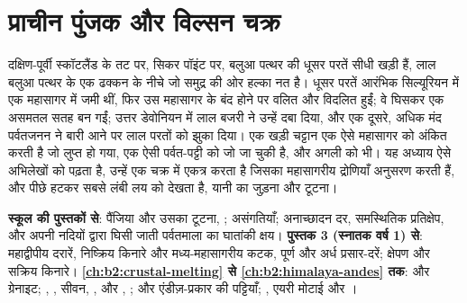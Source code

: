 \chapter{प्राचीन पुंजक और विल्सन चक्र}\label{ch:b2:wilson-cycle}

दक्षिण-पूर्वी स्कॉटलैंड के तट पर, सिकर पॉइंट पर, बलुआ पत्थर की धूसर परतें सीधी खड़ी हैं,
लाल बलुआ पत्थर के एक ढक्कन के नीचे जो समुद्र की ओर हल्का नत है। धूसर परतें आरंभिक सिल्यूरियन में
एक महासागर में जमी थीं, फिर उस महासागर के बंद होने पर वलित और विदलित हुईं; वे घिसकर
एक असमतल सतह बन गईं; उत्तर डेवोनियन में लाल बजरी ने उन्हें दबा दिया, और एक दूसरे,
अधिक मंद पर्वतजनन ने बारी आने पर लाल परतों को झुका दिया। एक खड़ी चट्टान एक ऐसे महासागर को अंकित करती है जो
लुप्त हो गया, एक ऐसी पर्वत-पट्टी को जो जा चुकी है, और अगली को भी। यह अध्याय ऐसे अभिलेखों को पढ़ता है,
उन्हें एक चक्र में एकत्र करता है जिसका महासागरीय द्रोणियाँ अनुसरण करती हैं, और पीछे हटकर सबसे लंबी लय को देखता है,
यानी  का जुड़ना और टूटना।

\begin{recall}
\textbf{स्कूल की पुस्तकों से}: पैंजिया और उसका टूटना, ; असंगतियाँ;
अनाच्छादन दर, समस्थितिक प्रतिक्षेप, और अपनी नदियों द्वारा घिसी जाती पर्वतमाला का घातांकी
क्षय। \textbf{पुस्तक 3 (स्नातक वर्ष 1) से}: महाद्वीपीय दरारें, निष्क्रिय किनारे और
मध्य-महासागरीय कटक, पूर्ण और अर्ध प्रसार-दरें; क्षेपण और सक्रिय किनारे।
\textbf{\cref{ch:b2:crustal-melting} से \cref{ch:b2:himalaya-andes} तक}:  और
ग्रेनाइट; , , सीवन, ,  और , ;  और
एंडीज़-प्रकार की पट्टियाँ; , एयरी मोटाई और ।
\end{recall}

